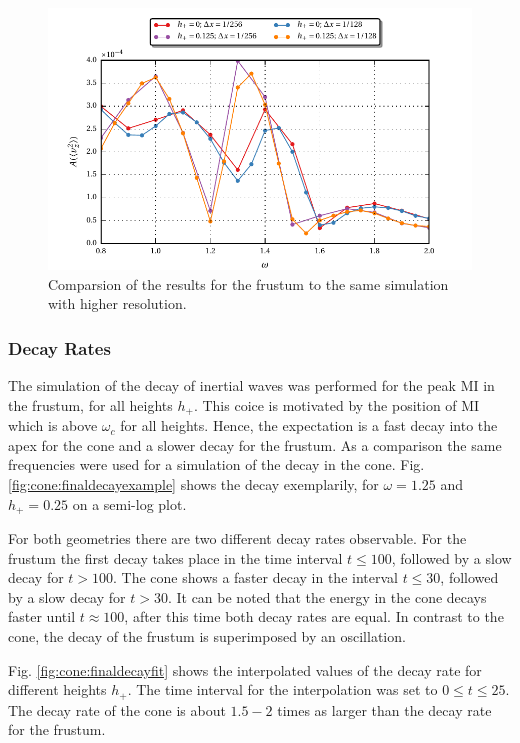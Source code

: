 \begin{figure}[!b]
  \centering
  \includegraphics{gfx/cone/final/hd_comparison.pdf}
  \caption{
      \label{fig:cone:finalhdcomp}
      Comparsion of the results for the frustum to the same simulation with higher resolution.
    }
\end{figure}
\clearpage

\subsubsection{Decay Rates}

The simulation of the decay of inertial waves was performed for the peak M\RN{1} in the frustum,
for all heights $h_+$.
This coice is motivated by the position of M\RN{1} which is above $\omega_c$ for all heights.
Hence, the expectation is a fast decay into the apex for the cone and a slower decay for the frustum.
As a comparison the same frequencies were used for a simulation of the decay in the cone.
Fig. \ref{fig:cone:finaldecayexample} shows the decay exemplarily,
for $\omega=1.25$ and $h_+=0.25$ on a semi-log plot.

For both geometries there are two different decay rates observable.
For the frustum the first decay takes place in the time interval $t\leq 100$,
followed by a slow decay for $t>100$.
The cone shows a faster decay in the interval $ t\leq 30$, followed by a slow decay for $t>30$.
It can be noted that the energy in the cone decays faster until $t\approx100$, after this time
both decay rates are  equal.  In contrast to the cone, the decay of the frustum  is superimposed by an oscillation.

Fig. \ref{fig:cone:finaldecayfit} shows the interpolated values of the decay rate for different
heights $h_+$.  The time interval for the interpolation was set to $0 \leq t \leq 25$.
The decay rate of the cone is about $1.5-2$ times as larger than the decay rate for the frustum.

